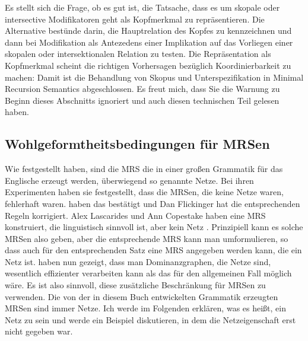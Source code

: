 Es stellt sich die Frage, ob es gut ist, die Tatsache, dass es um skopale oder intersective
Modifikatoren geht als Kopfmerkmal zu repräsentieren. Die Alternative bestünde darin, die
Hauptrelation des Kopfes zu kennzeichnen und dann bei Modifikation als Antezedens einer Implikation
auf das Vorliegen einer skopalen oder intersektionalen Relation zu testen. Die Repräsentation als
Kopfmerkmal scheint die richtigen Vorhersagen bezüglich Koordinierbarkeit zu machen:
\eal
{}
\zl
Damit ist die Behandlung von Skopus und Unterspezifikation in Minimal Recursion Semantics abgeschlossen. Es freut mich, dass Sie
die Warnung zu Beginn dieses Abschnitts ignoriert und auch diesen technischen Teil gelesen haben.

\subsection{Wohlgeformtheitsbedingungen für MRSen}
\label{sec-Wohlgeformtheitsbedingungen für MRSen}
\label{Abschnitt-Semantik-possessive-Relativpronomina}

Wie \citet*{FucKolNieTha2004a} festgestellt haben, sind die MRS die in einer großen Grammatik für
das Englische \citep{CF2000a-u} erzeugt werden, überwiegend so genannte Netze. Bei ihren
Experimenten haben sie festgestellt, dass die MRSen, die keine Netze waren, fehlerhaft
waren. \citet*{FKT2005a} haben das bestätigt und Dan Flickinger hat die entsprechenden Regeln
korrigiert. Alex Lascarides und Ann Copestake haben eine MRS konstruiert, die linguistisch sinnvoll ist, aber
kein Netz \citep[Abschnitt~4.3]{FKT2005a}. Prinzipiell kann es solche MRSen also geben, aber die entsprechende MRS kann man
umformulieren, so dass auch für den entsprechenden Satz eine MRS angegeben werden kann, die ein Netz
ist. \citet{ADKMNT2003a} haben nun gezeigt, dass man Dominanzgraphen, die Netze sind, wesentlich effizienter
verarbeiten kann als das für den allgemeinen Fall möglich wäre. Es ist also sinnvoll, diese
zusätzliche Beschränkung für MRSen zu verwenden. Die von der in diesem Buch entwickelten Grammatik
erzeugten MRSen sind immer Netze. Ich werde im Folgenden erklären, was es heißt, ein Netz zu sein
und werde ein Beispiel diskutieren, in dem die Netzeigenschaft erst nicht gegeben war. 

